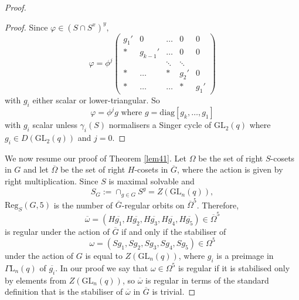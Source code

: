 \documentclass[a4paper,reqno,11pt]{amsart}
\theoremstyle{definition}
\theoremstyle{remark}
\numberwithin{equation}{section}
\newcommand{\diag}{\mathrm{diag}}
\newcommand{\Reg}{\mathrm{Reg}}
\newcommand{\GaL}{{\Gamma \mathrm{L}}}
\newcommand{\GL}{{\mathrm{GL}}}
\newcommand{\PGL}{{\mathrm{PGL}}}
\begin{document}
\begin{proof}
\begin{proof}
Since $\varphi \in (S \cap S^x)^y,$
$$
\varphi = \phi^j 
\begin{pmatrix}
g_1'     & 0 & \ldots & 0 & 0 \\
*          &    g_{k-1}'  & \ldots & 0 & 0 \\
     &     & \ddots & \ddots  &    \\
   *    &    \ldots& * & g_{2}' & 0 \\
      *    &   \ldots        & \ldots& * & g_{1}'
\end{pmatrix}
$$ with $g_i$ either scalar or lower-triangular. So 
\begin{equation}
\label{phidiagG}
\varphi =\phi^j g \text{ where } g=\diag[g_k, \ldots, g_1]
\end{equation}
 with $g_i$ scalar unless $\gamma_i(S)$ normalisers a Singer cycle of $\GL_2(q)$  where $g_i \in D(\GL_2(q))$ and $j=0$.  
\end{proof}

\medskip

We now resume our proof of Theorem \ref{lem41}.
Let $\Omega$ be the set of right $S$-cosets in $G$ and let $\overline{\Omega}$ be the set of right $H$-cosets in $\overline{G}$, where the action is given by  right multiplication.  Since $S$ is maximal solvable and $$S_{G}:=\cap_{g \in G} S^g=Z(\GL_n(q)),$$ $\Reg_S(G,5)$ is the number of $\overline{G}$-regular orbits on  $\overline{\Omega}^5$.   Therefore, $$\overline{\omega}=(H\overline{g_1},H\overline{g_2},H\overline{g_3},H\overline{g_4},H\overline{g_5}) \in \overline{\Omega}^5$$ is regular under the action of $\overline{G}$ if and only if the stabiliser of $$ \omega =(Sg_1, Sg_2, Sg_3,Sg_4, Sg_5) \in \Omega^5$$ under the action of $G$ is equal to $Z(\GL_n(q))$, where $g_i$ is a preimage in $\GaL_n(q)$ of $\overline{g_i}.$  
In our proof we say that   $\omega \in \Omega^5$ is regular if it is stabilised only by elements from $Z(\GL_n(q))$, so $\overline{\omega}$ is regular in terms of the standard definition that is the stabiliser of $\overline{\omega}$ in $\overline{G}$ is trivial.  


\end{proof}
\end{document}
